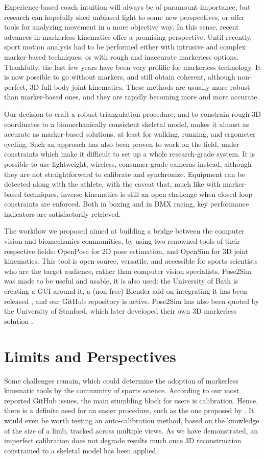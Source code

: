 Experience-based coach intuition will always be of paramount importance, but research can hopefully shed unbiased light to some new perspectives, or offer tools for analyzing movement in a more objective way. In this sense, recent advances in markerless kinematics offer a promising perspective. Until recently, sport motion analysis had to be performed either with intrusive and complex marker-based techniques, or with rough and inaccurate markerless options. Thankfully, the last few years have been very prolific for markerless technology. It is now possible to go without markers, and still obtain coherent, although non-perfect, 3D full-body joint kinematics. These methods are usually more robust than marker-based ones, and they are rapidly becoming more and more accurate. 

Our decision to craft a robust triangulation procedure, and to constrain rough 3D coordinates to a biomechanically consistent skeletal model, makes it almost as accurate as marker-based solutions, at least for walking, running, and ergometer cycling. Such an approach has also been proven to work on the field, under constraints which make it difficult to set up a whole research-grade system. It is possible to use lightweight, wireless, consumer-grade cameras instead, although they are not straightforward to calibrate and synchronize. Equipment can be detected along with the athlete, with the caveat that, much like with marker-based techniques, inverse kinematics is still an open challenge when closed-loop constraints are enforced. Both in boxing and in BMX racing, key performance indicators are satisfactorily retrieved. 

The workflow we proposed aimed at building a bridge between the computer vision and biomechanics communities, by using two renowned tools of their respective fields: OpenPose for 2D pose estimation, and OpenSim for 3D joint kinematics. This tool is open-source, versatile, and accessible for sports scientists who are the target audience, rather than computer vision specialists. Pose2Sim was made to be useful and usable, it is also used: the University of Bath is creating a GUI around it, a (non-free) Blender add-on integrating it has been released \cite{Barreto2022}, and our GitHub repository is active. Pose2Sim has also been quoted by the University of Stanford, which later developed their own 3D markerless solution \cite{Uhlrich2022}. 


\section*{Limits and Perspectives}
Some challenges remain, which could determine the adoption of markerless kinematic tools by the community of sports science. According to our most reported GitHub issues, the main stumbling block for users is calibration. Hence, there is a definite need for an easier procedure, such as the one proposed by \cite{Argus}. It would even be worth testing an auto-calibration method, based on the knowledge of the size of a limb, tracked across multiple views. As we have demonstrated, an imperfect calibration does not degrade results much once 3D reconstruction constrained to a skeletal model has been applied. 

